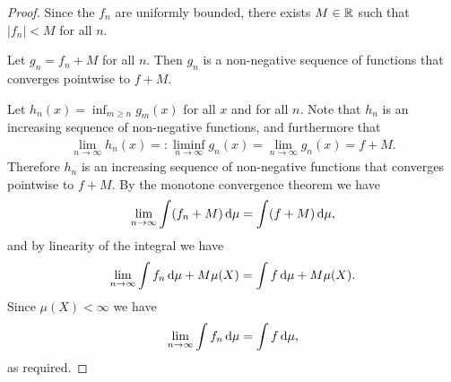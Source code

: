 \begin{proof}
  Since the $f_n$ are uniformly bounded, there exists $M \in \mathbb{R}$ such that $|f_n| < M$ for all $n$.

  Let $g_n = f_n + M$ for all $n$. Then $g_n$ is a non-negative sequence of functions that converges
  pointwise to $f + M$.

  Let $h_n(x) = \inf_{m \geq n} g_m(x)$ for all $x$ and for all $n$. Note that $h_n$ is an increasing sequence
  of non-negative functions, and furthermore that
  \begin{align*}
    \lim_{n \to \infty} h_n(x) =: \liminf_{n \to \infty} g_n(x) = \lim_{n \to \infty} g_n(x) = f + M.
  \end{align*}
  Therefore $h_n$ is an increasing sequence of non-negative functions that converges pointwise to $f + M$. By
  the monotone convergence theorem we have
  \begin{align*}
    \lim_{n\to\infty} \int (f_n + M) \d\mu = \int (f + M) \d\mu,
  \end{align*}
  and by linearity of the integral we have
  \begin{align*}
    \lim_{n\to\infty} \int f_n \d\mu + M \mu(X) = \int f \d\mu + M \mu(X).
  \end{align*}
  Since $\mu(X) < \infty$ we have
  \begin{align*}
    \lim_{n\to\infty} \int f_n \d\mu = \int f \d\mu,
  \end{align*}
  as required.
\end{proof}
